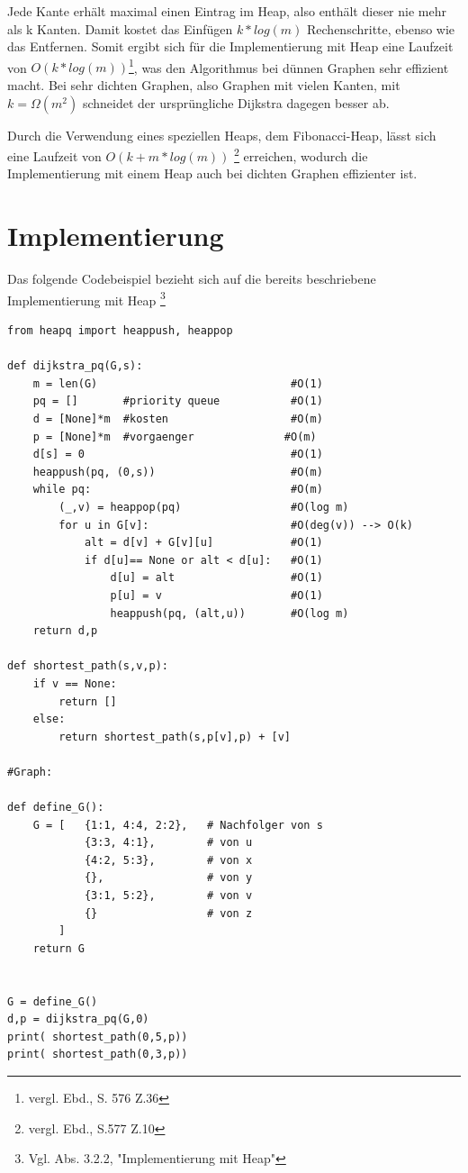 \parindent0pt Jede Kante erhält maximal einen Eintrag im Heap, also enthält dieser nie mehr als k Kanten. Damit kostet das Einfügen $k*log(m)$ Rechenschritte, ebenso wie das Entfernen. Somit ergibt sich für die Implementierung mit Heap eine Laufzeit von $O(k*log(m))$\footnote{vergl. Ebd., S. 576 Z.36}, was den Algorithmus bei dünnen Graphen sehr effizient macht.
Bei sehr dichten Graphen, also Graphen mit vielen Kanten,  mit $k = \Omega (m^{2})$ schneidet der ursprüngliche Dijkstra dagegen besser ab.

\parindent0pt Durch die Verwendung eines speziellen Heaps, dem Fibonacci-Heap, lässt sich eine Laufzeit von $O(k + m * log(m))$ \footnote{vergl. Ebd., S.577 Z.10} erreichen, wodurch die Implementierung mit einem Heap auch bei dichten Graphen effizienter ist.


\section{Implementierung}

Das folgende Codebeispiel bezieht sich auf die bereits beschriebene Implementierung mit Heap \footnote{Vgl. Abs. 3.2.2, "Implementierung mit Heap"}

\lstset{language=Python}
\begin{lstlisting}
from heapq import heappush, heappop

def dijkstra_pq(G,s):
    m = len(G)                              #O(1)
    pq = []       #priority queue           #O(1)
    d = [None]*m  #kosten                   #O(m)
    p = [None]*m  #vorgaenger		       #O(m)
    d[s] = 0                                #O(1)
    heappush(pq, (0,s))                     #O(m)
    while pq:                               #O(m)
        (_,v) = heappop(pq)                 #O(log m)
        for u in G[v]:                      #O(deg(v)) --> O(k)  
            alt = d[v] + G[v][u]            #O(1)
            if d[u]== None or alt < d[u]:   #O(1)
                d[u] = alt		            #O(1)	
               	p[u] = v                    #O(1)
                heappush(pq, (alt,u))       #O(log m)        
    return d,p

def shortest_path(s,v,p):
	if v == None:
		return []
	else:
		return shortest_path(s,p[v],p) + [v]
 
#Graph: 
    
def define_G():
    G = [   {1:1, 4:4, 2:2},   # Nachfolger von s
            {3:3, 4:1},        # von u
            {4:2, 5:3},        # von x
            {},                # von y
            {3:1, 5:2},        # von v
            {}                 # von z
        ]
    return G


G = define_G()
d,p = dijkstra_pq(G,0)
print( shortest_path(0,5,p))
print( shortest_path(0,3,p))
\end{lstlisting}

